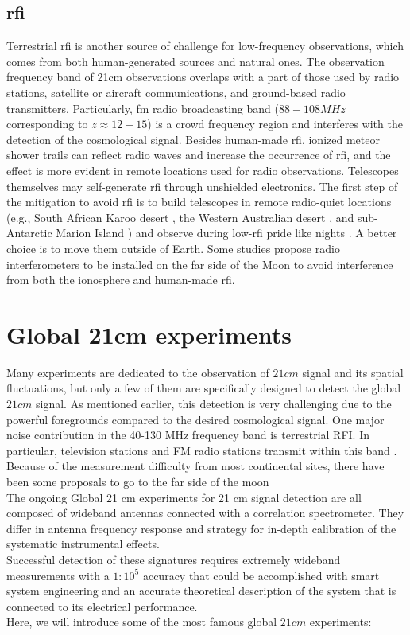 \documentclass[12pt, TexShade, letterpaper]{report}
\begin{document}
\subsection{\gls{rfi}}
Terrestrial \gls{rfi} is another source of challenge for low-frequency observations, which comes from both human-generated sources and natural ones. The observation frequency band of 21cm observations overlaps with a part of those used by radio stations, satellite or aircraft communications, and ground-based radio transmitters. Particularly, \gls{fm} radio broadcasting band ($88-108MHz$ corresponding to $z \approx 12-15$) is a crowd frequency region and interferes with the detection of the cosmological signal. 
Besides human-made \gls{rfi}, ionized meteor shower trails can reflect radio waves and increase the occurrence of \gls{rfi}, and the effect is more evident in remote locations used for radio observations. Telescopes themselves may self-generate \gls{rfi} through unshielded electronics. 
The first step of the mitigation to avoid \gls{rfi} is to build telescopes in remote radio-quiet locations (e.g., South African Karoo desert \cite{reach_design}, the Western Australian desert \cite{edges}, and sub-Antarctic Marion Island \cite{prizm_2017, prizm_thesis, rfi_1}) and observe during low-\gls{rfi} pride like nights \cite{leda_design}. A better choice is to move them outside of Earth. Some studies propose radio interferometers to be installed on the far side of the Moon to avoid interference from both the ionosphere and human-made \cite{lunar_far_side} \gls{rfi}. 
\section{Global 21cm experiments}
Many experiments are dedicated to the observation of $21cm$ signal and its spatial fluctuations, but only a few of them are specifically designed to detect the global $21cm$ signal. As mentioned earlier, this detection is very challenging due to the powerful foregrounds compared to the desired cosmological signal. One major noise contribution in the 40-130 MHz frequency band is terrestrial RFI. In particular, television stations and FM radio stations transmit within this band \cite{sci-hi_1}.
Because of the measurement difficulty from most continental sites, there have been some proposals to go to the far side of the moon\\
The ongoing Global 21 cm experiments for 21 cm signal detection are all composed of wideband antennas connected with a correlation spectrometer. They differ in antenna frequency response and strategy for in-depth calibration of the systematic instrumental effects. \cite{hyperion_1}\\
Successful detection of these signatures requires extremely wideband measurements with a $1:10^5$ accuracy that could be accomplished with smart system engineering and an accurate theoretical description of the system that is connected to its electrical performance.\cite{hyperion_2}\\
Here, we will introduce some of the most famous global $21cm$ experiments:\par
\end{document}
